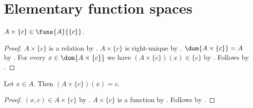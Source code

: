 



\section{Elementary function spaces}

\begin{proposition}\label{constant_graph_type}
    $A\times\{c\}\in\funs{A}{\{c\}}$.
\end{proposition}
\begin{proof}
    $A\times\{c\}$ is a relation by .
    $A\times\{c\}$ is right-unique
        by .
    $\dom{A\times\{c\}}=A$
        by
        .
    For every $x\in\dom{A\times\{c\}}$ we have
        $(A\times\{c\})(x)\in\{c\}$
        by .
    Follows by .
\end{proof}

\begin{proposition}\label{constant_graph_application}
    Let $x\in A$.
    Then $(A\times\{c\})(x)=c$.
\end{proposition}
\begin{proof}
    $(x,c)\in A\times\{c\}$
        by .
    $A\times\{c\}$ is a function by
        .
    Follows by .
\end{proof}

